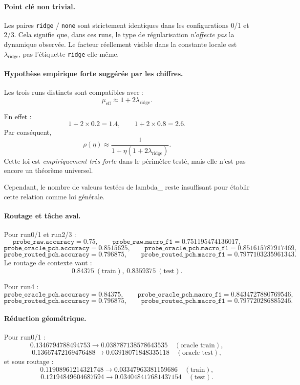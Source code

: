 \paragraph{Point clé non trivial.}
Les paires \texttt{ridge} / \texttt{none} sont strictement identiques dans les configurations 0/1 et 2/3. Cela signifie que, dans ces runs, le type de régularisation \emph{n’affecte pas} la dynamique observée. Le facteur réellement visible dans la constante locale est \(\lambda_{\mathrm{ridge}}\), pas l’étiquette \texttt{ridge} elle-même.

\paragraph{Hypothèse empirique forte suggérée par les chiffres.}
Les trois runs distincts sont compatibles avec :
\[
\mu_{\mathrm{eff}}
\approx
1+2\lambda_{\mathrm{ridge}}.
\]



En effet :
\[
1+2\times 0.2 = 1.4,
\qquad
1+2\times 0.8 = 2.6.
\]
Par conséquent,
\[
\rho(\eta)
\approx
\frac{1}{1+\eta(1+2\lambda_{\mathrm{ridge}})}.
\]
Cette loi est \emph{empiriquement très forte} dans le périmètre testé, mais elle n’est pas encore un théorème universel.

Cependant, le nombre de valeurs testées de lambda_{} reste insuffisant pour établir cette relation comme loi générale.

\paragraph{Routage et tâche aval.}
Pour run0/1 et run2/3 :
\[
\texttt{probe\_raw.accuracy}=0.75,\qquad \texttt{probe\_raw.macro\_f1}=0.751195474136017,
\]
\[
\texttt{probe\_oracle\_pch.accuracy}=0.8515625,\qquad \texttt{probe\_oracle\_pch.macro\_f1}=0.851615787917469,
\]
\[
\texttt{probe\_routed\_pch.accuracy}=0.796875,\qquad \texttt{probe\_routed\_pch.macro\_f1}=0.7977103235961343.
\]
Le routage de contexte vaut :
\[
0.84375\ (\text{train}),\ 0.8359375\ (\text{test}).
\]

Pour run4 :
\[
\texttt{probe\_oracle\_pch.accuracy}=0.84375,\qquad \texttt{probe\_oracle\_pch.macro\_f1}=0.8434727880769546,
\]
\[
\texttt{probe\_routed\_pch.accuracy}=0.796875,\qquad \texttt{probe\_routed\_pch.macro\_f1}=0.797720286885246.
\]

\paragraph{Réduction géométrique.}
Pour run0/1 :
\[
0.1346794788494753 \to 0.038787138578643535\quad(\text{oracle train}),
\]
\[
0.13667472169476488 \to 0.03918071848335118\quad(\text{oracle test}),
\]
et sous routage :
\[
0.11908961214321748 \to 0.03347963381159686\quad(\text{train}),
\]
\[
0.12194849604687594 \to 0.034048417681437154\quad(\text{test}).
\]

